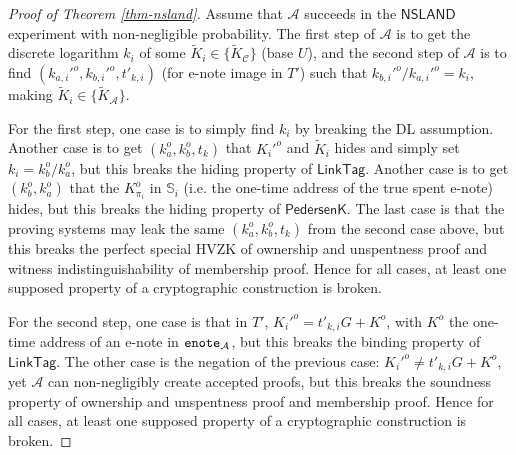 \documentclass{article}
\begin{document}
\begin{proof}[Proof of Theorem \ref{thm-nsland}]
Assume that $\mathcal{A}$ succeeds in the $\textsf{NSLAND}$ experiment with non-negligible probability. The first step of $\mathcal{A}$ is to get the discrete logarithm $k_i$ of some $\tilde{K}_i \in \{\tilde{K}_{\mathcal{C}}\}$ (base $U$), and the second step of $\mathcal{A}$ is to find $(k_{a,i}'^o, k_{b,i}'^o, t'_{k,i})$ (for e-note image in $T'$) such that $k_{b,i}'^o/k_{a,i}'^o = k_i$, making $\tilde{K}_i \in \{\tilde{K}_{\mathcal{A}}\}$.

For the first step, one case is to simply find $k_i$ by breaking the DL assumption. Another case is to get $(k_a^o, k_b^o, t_k)$ that $K_i'^o$ and $\tilde{K}_i$ hides and simply set $k_i = k_b^o / k_a^o$, but this breaks the hiding property of $\textsf{LinkTag}$. Another case is to get $(k_b^o, k_a^o)$ that the $K_{\pi_i}^o$ in $\mathbb{S}_i$ (i.e. the one-time address of the true spent e-note) hides, but this breaks the hiding property of $\textsf{PedersenK}$. The last case is that the proving systems may leak the same $(k_a^o, k_b^o, t_k)$ from the second case above, but this breaks the perfect special HVZK of ownership and unspentness proof and witness indistinguishability of membership proof. Hence for all cases, at least one supposed property of a cryptographic construction is broken.

For the second step, one case is that in $T'$, $K_i'^o = t'_{k,i} G+ K^o$, with $K^o$ the one-time address of an e-note in ${\tt enote}_{\mathcal{A}}$, but this breaks the binding property of $\textsf{LinkTag}$. The other case is the negation of the previous case: $K_i'^o \ne t'_{k,i} G+ K^o$, yet $\mathcal{A}$ can non-negligibly create accepted proofs, but this breaks the soundness property of ownership and unspentness proof and membership proof. Hence for all cases, at least one supposed property of a cryptographic construction is broken.
\end{proof}
\end{document}

